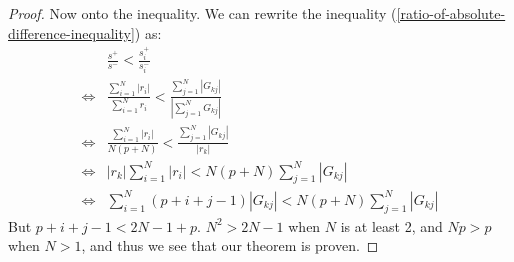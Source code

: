 \documentclass{article}
\newtheorem{lem}[thm]{Lemma}
\theoremstyle{definition}
\theoremstyle{remark}
\numberwithin{equation}{section}
\begin{document}
\begin{proof}
Now onto the inequality. We can rewrite the inequality (\ref{ratio-of-absolute-difference-inequality}) as: 
\begin{align*}
&\frac{s^+}{s^-} < \frac{s_i^+}{s_i^-} \\
\iff & \frac{\sum_{i=1}^N |r_i|}{\sum_{i=1}^N r_i} < \frac{\sum_{j=1}^N |G_{kj}|}{\left | \sum_{j=1}^N G_{kj} \right|}\\
\iff & \frac{\sum_{i=1}^N |r_i |}{ N(p+N)} < \frac{\sum_{j=1}^N |G_{kj}|}{|r_k|}\\
\iff & |r_k| \sum_{i=1}^N |r_i| < N(p+N) \sum_{j=1}^N |G_{kj}|\\
\iff & \sum_{i=1}^N (p+i+j-1) |G_{kj}| < N(p+N) \sum_{j=1}^N |G_{kj}|
\end{align*} But $p+i+j-1 < 2N-1+p$. $N^2 > 2N-1$ when $N$ is at least 2, and $Np>p$ when $N>1$, and thus we see that our theorem is proven.
\begin{comment}We write down two lemmas on binomial coefficients that will prove useful. Both are well-known and easily verified.
\begin{lem}\label{absorption-combination}
Let $N>j>0$. Then 
\[ j \dbinom{N}{j} = j \dbinom{N}{N-j} = N \dbinom{N-1}{j-1}\]
\end{lem} 

\begin{lem}\label{subset-of-a-subset-combination}
\[ \dbinom{N}{m} \dbinom{m}{k} = \dbinom{N}{k} \dbinom{N-k}{m-k} \]
\end{lem} 
\bigskip


Note that in our expressions for the individual entries or sums of rows of $G$, there is usually a term like $(-1)^{i+j}$ dictating the sign of the value. Since we wish to compare a ratio of sums after taking an absolute value, we can in fact ignore the sign term. Thus plugging in our values from our propositions into the inequality \ref{ratio-of-absolute-difference-inequality}, we see that our inequality is equivalent to 

\begin{equation}\label{inequality-all-expressions}
\frac{\sum_{i=1}^N i \dbinom{N-1+p+i}{N} \dbinom{N}{i}}{N(P+N)} < \frac{\sum_{j=1}^N (p+k+j-1) \dbinom{N+p+k-1}{N-j} \dbinom{N+p+j-1}{N-k} \dbinom{p+k+j-2}{k-1}^2 }{k \dbinom{N-1+p+k}{N}\dbinom{N}{k}} 
\end{equation}  for every $k\in \{ 1,...,N\}$.\\

Let us first consider the LHS. Using Proposition \ref{absorption-combination}, we see that 
\begin{align}
\frac{\sum_{i=1}^N i \dbinom{N-1+p+i}{N} \dbinom{N}{i}}{N(P+N)}  &= \frac{\sum_{i=1}^N N \dbinom{N-1+p+i}{N}  \dbinom{N-1}{i-1}}{N(P+N)} \\
&= \frac{\sum_{i=1}^N\dbinom{N-1+p+i}{N}  \dbinom{N-1}{i-1}}{P+N} \\
&< \frac{\sum_{i=1}^N\dbinom{N-1+p+i}{N}  \dbinom{N}{i}}{P+N} \label{LHS-upper-bound}
\end{align}


\end{comment}
\end{proof}
\end{document}
